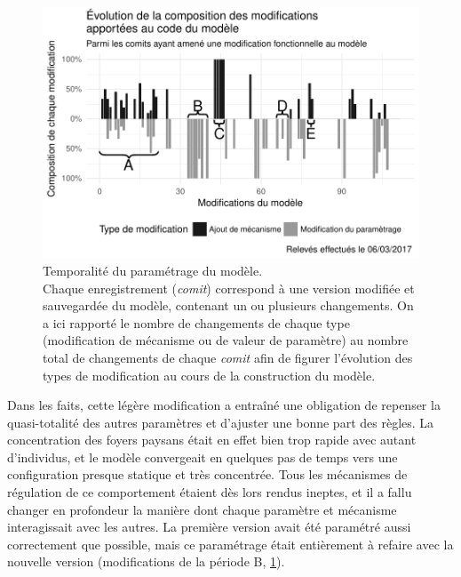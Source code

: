 \begin{figure}[H]
	\includegraphics[width = \linewidth]{img/plotComits.pdf}
	\caption[Temporalité du paramétrage du modèle.]{Temporalité du paramétrage du modèle.\\
		Chaque \og enregistrement\fg{} (\textit{comit}) correspond à une version modifiée et sauvegardée du modèle, contenant un ou plusieurs changements.
		On a ici rapporté le nombre de changements de chaque type (modification de mécanisme ou de valeur de paramètre) au nombre total de changements de chaque \textit{comit} afin de figurer l'évolution des types de modification au cours de la construction du modèle.}
	\label{fig:comits-periodes}
\end{figure}

Dans les faits, cette légère modification a entraîné une obligation de repenser la quasi-totalité des autres paramètres et d'ajuster une bonne part des règles. 
La concentration des foyers paysans était en effet bien trop rapide avec autant d'individus, et le modèle convergeait en quelques pas de temps vers une configuration presque statique et très concentrée.
Tous les mécanismes de régulation de ce comportement étaient dès lors rendus ineptes, et il a fallu changer en profondeur la manière dont chaque paramètre et mécanisme interagissait avec les autres.
La première version avait été paramétré aussi correctement que possible, mais ce paramétrage était entièrement à refaire avec la nouvelle version (modifications de la période B, \cref{fig:comits-periodes}).

